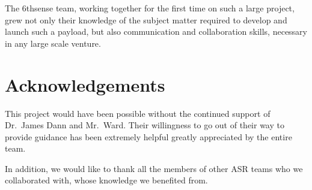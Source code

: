 \documentclass[12pt,]{article}
\begin{document}
The 6thsense team, working together for the first time on such a large
project, grew not only their knowledge of the subject matter required to
develop and launch such a payload, but also communication and
collaboration skills, necessary in any large scale venture.

\section{Acknowledgements}\label{acknowledgements}

This project would have been possible without the continued support of
Dr.~James Dann and Mr.~Ward. Their willingness to go out of their way to
provide guidance has been extremely helpful greatly appreciated by the
entire team.

In addition, we would like to thank all the members of other ASR teams
who we collaborated with, whose knowledge we benefited from.
\end{document}
